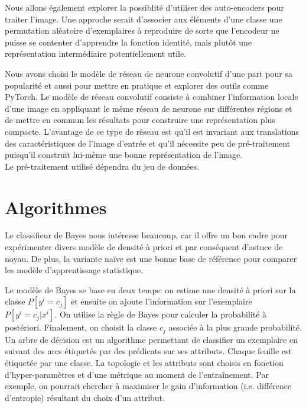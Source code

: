 \documentclass[12pt,letterpaper]{article}
\begin{document}
Nous allons également explorer la possiblité d'utiliser des auto-encoders pour
traiter l'image. Une approche serait d'associer aux éléments d'une classe une
permutation aléatoire d'exemplaires à reproduire de sorte que l'encodeur ne
puisse se contenter d'apprendre la fonction identité, mais plutôt une
représentation intermédiaire potentiellement utile.

Nous avons choisi le modèle de réseau de neurone convolutif d'une part pour sa
popularité et aussi pour mettre en pratique et explorer des outils comme
PyTorch. Le modèle de réseau convolutif consiste à combiner l'information
locale d'une image en appliquant le même réseau de neurone sur différentes
régions et de mettre en commun les résultats pour construire une représentation
plus compacte. L'avantage de ce type de réseau est qu'il est invariant aux
translations des caractéristiques de l'image d'entrée et qu'il nécessite peu de
pré-traitement puisqu'il construit lui-même une bonne représentation de l'image.
\\

Le pré-traitement utilisé dépendra du jeu de données.

\section{Algorithmes}

Le classifieur de Bayes nous intéresse beaucoup, car il offre un bon cadre pour
expérimenter divers modèle de densité à priori et par conséquent d'astuce
de noyau. De plus, la variante naïve est une bonne base de référence pour
comparer les modèle d'apprentissage statistique.

Le modèle de Bayes se base en deux temps: on estime une densité à priori sur la
classe $P[y^i = c_j]$ et ensuite on ajoute l'information sur l'exemplaire
$P[y^i = c_j | x^i]$. On utilise la règle de Bayes pour calculer la probabilité
à postériori. Finalement, on choisit la classe $c_j$ associée à la plus grande
probabilité.
\\

Un arbre de décision est un algorithme permettant de classifier un exemplaire
en suivant des arcs étiquetés par des prédicats sur ses attributs. Chaque
feuille est étiquetée par une classe. La topologie et les attributs sont
choisis en fonction d'hyper-paramètres et d'une métrique au moment de
l'entraînement. Par exemple, on pourrait chercher à maximiser le gain
d'information (i.e.  différence d'entropie) résultant du choix d'un attribut.
\\
\end{document}
